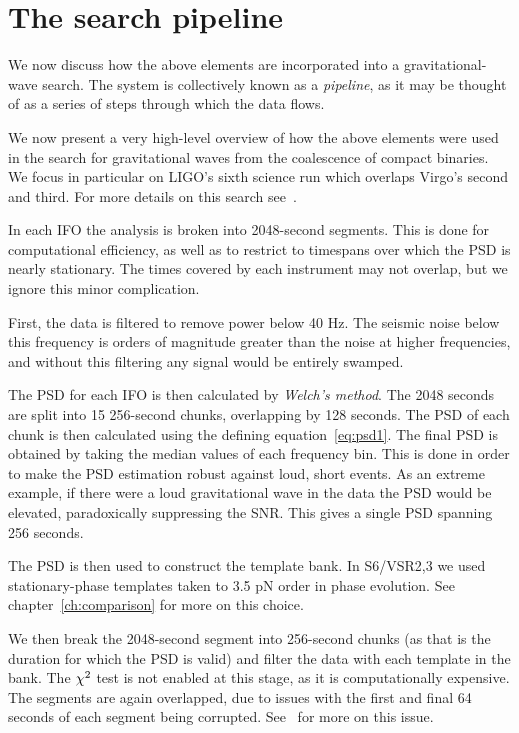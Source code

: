 \section{The search pipeline}
\label{sec:search_pipeline}

We now discuss how the above elements are incorporated into 
a gravitational-wave search.  The system is collectively known as a
\emph{pipeline}, as it may be thought of as a series of steps through
which the data flows.

We now present a very high-level overview of how the above elements
were used in the search for gravitational waves from the coalescence
of compact binaries.  We focus in particular on LIGO's sixth science
run which overlaps Virgo's second and third.  For more details on this
search see~\cite{Capano:thesis}.

In each IFO the analysis is broken into 2048-second segments.  This is
done for computational efficiency, as well as to restrict to timespans
over which the PSD is nearly stationary.  The times covered by each
instrument may not overlap, but we ignore this minor complication.

First, the data is filtered to remove power below 40 Hz.  The seismic
noise below this frequency is orders of magnitude greater than  the
noise at higher frequencies, and without this filtering any signal
would be entirely swamped.

The PSD for each IFO is then calculated by \emph{Welch's method}.  The
2048 seconds are split into 15 256-second chunks, overlapping by 128
seconds.  The PSD of each chunk is then calculated using the defining
equation~\ref{eq:psd1}.  The final PSD is obtained by taking the
median values of each frequency bin. This is done in order to make the
PSD estimation robust against loud, short events.  As an extreme
example, if there were a loud gravitational wave in the data the PSD
would be elevated, paradoxically suppressing the SNR.  This gives a
single PSD spanning 256 seconds.

The PSD is then used to construct the template bank.  In S6/VSR2,3 we
used stationary-phase templates taken to 3.5 pN order in phase
evolution.  See chapter~\ref{ch:comparison} for more on this choice.

We then break the 2048-second segment into 256-second chunks (as that
is the duration for which the PSD is valid) and filter the data with
each template in the bank.  The $\chi^2$ test is not enabled at this
stage, as it is computationally expensive.  The segments are again
overlapped, due to issues with the first and final 64 seconds of each
segment being corrupted.  See~\cite{DBrownThesis} for more on this
issue.

